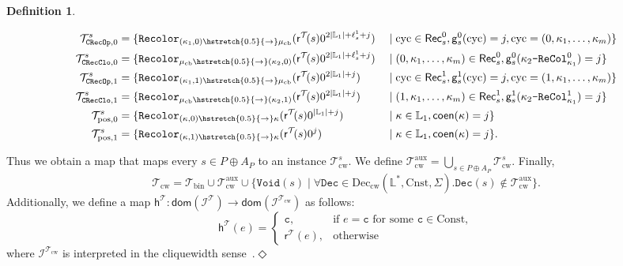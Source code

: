 \documentclass[10pt,a4paper]{amsart}
\theoremstyle{definition}
\numberwithin{equation}{section}
\theoremstyle{plain}
\theoremstyle{definition}
\newtheorem{definition}[definition]{Definition}
\theoremstyle{myexample}
\theoremstyle{plain}
\theoremstyle{definition}
\newcommand{\instance}{\mathcal{I}}
\newcommand{\inst}{\instance}
\newcommand{\adom}[1]{\fcn{dom}(#1)}
\newcommand{\cols}{\mathbb{L}}
\newcommand{\disun}{\oplus}
\newcommand{\recol}[2]{#2\pred{\texttt{-}ReCol}_{#1}}
\newcommand{\fcn}[1]{\mathsf{#1}}
\newcommand{\pred}[1]{\mathtt{#1}}
\newcommand{\const}[1]{\mathtt{#1}}
\newcommand{\defend}{\hfill\ensuremath{\Diamond}}
\newcommand{\shortto}{\hstretch{0.5}{\to}}
\begin{document}
\begin{definition}
\begin{itemize}
\begin{align*}
			\mathcal{T}_{\pred{CRecOp}, 0}^{s} &=  \{ \pred{Recolor}_{(\kappa_1, 0)\shortto\mu_{\mathrm{cb}}}(\fcn{r}^{\mathcal{T}}\!(s)0^{2|\cols_1| + \ell_s^1+ j}) &&\mid \mathrm{cyc}\in\fcn{Rec}_s^{0}, \fcn{g}_s^{0}(\mathrm{cyc}) = j, \mathrm{cyc} = (0, \kappa_1, \ldots, \kappa_m)  \} \\
			\mathcal{T}_{\pred{CRecClo}, 0}^{s} &=  \{ \pred{Recolor}_{\mu_{\mathrm{cb}} \shortto (\kappa_2, 0)}(\fcn{r}^{\mathcal{T}}\!(s)0^{2|\cols_1| + \ell_s^1+ j}) &&\mid (0, \kappa_1, \ldots, \kappa_m)\in\fcn{Rec}_s^{0} , \fcn{g}_s^{0}(\recol{\kappa_1}{\kappa_2}^0) = j \} \\
			\mathcal{T}_{\pred{CRecOp}, 1}^{s} &=  \{ \pred{Recolor}_{(\kappa_1, 1)\shortto\mu_{\mathrm{cb}}}(\fcn{r}^{\mathcal{T}}\!(s)0^{2|\cols_1|  + j}) &&\mid  \mathrm{cyc}\in\fcn{Rec}_s^{1}, \fcn{g}_s^{1}( \mathrm{cyc}) = j, \mathrm{cyc} = (1, \kappa_1, \ldots, \kappa_m) \} \\
			\mathcal{T}_{\pred{CRecClo}, 1}^{s} &=  \{ \pred{Recolor}_{\mu_{\mathrm{cb}} \shortto (\kappa_2, 1)}(\fcn{r}^{\mathcal{T}}\!(s)0^{2|\cols_1| + j}) &&\mid (1, \kappa_1, \ldots, \kappa_m)\in\fcn{Rec}_s^{1} , \fcn{g}_s^{1}(\recol{\kappa_1}{\kappa_2}^1) = j \} \\
			\mathcal{T}_{\mathrm{pos}, 0}^{s} &=  \{ \pred{Recolor}_{(\kappa, 0)\shortto \kappa}(\fcn{r}^{\mathcal{T}}\!(s)0^{|\cols_1|+j}) &&\mid \kappa\in\cols_1, \fcn{coen}(\kappa) = j \} \\
			\mathcal{T}_{\mathrm{pos}, 1}^{s} &=  \{ \pred{Recolor}_{(\kappa, 1)\shortto \kappa}(\fcn{r}^{\mathcal{T}}\!(s)0^{j}) &&\mid \kappa\in\cols_1, \fcn{coen}(\kappa) = j \}.
		\end{align*}
	\end{itemize}
	Thus we obtain a map that maps every $s\in P\oplus A_P$ to an instance $\mathcal{T}_{\mathrm{cw}}^s$.
	We define $\mathcal{T}_{\mathrm{cw}}^{\mathrm{aux}} = \bigcup_{s\in P\disun A_P}\mathcal{T}_{\mathrm{cw}}^{s}$. Finally,
	$$\mathcal{T}_{\mathrm{cw}} = \mathcal{T}_{\mathrm{bin}} \cup \mathcal{T}_{\mathrm{cw}}^{\mathrm{aux}} \cup \{ \pred{Void}(s) \mid \forall \pred{Dec} \in\mathrm{Dec}_{\mathrm{cw}}(\cols^*, \mathrm{Cnst}, \Sigma).  \pred{Dec}(s)\notin \mathcal{T}_{\mathrm{cw}}^{\mathrm{aux}} \}.$$%
	Additionally, we define a map $\fcn{h}^{\mathcal{T}}\colon \adom{\inst^{\mathcal{T}}} \to \adom{\inst^{\mathcal{T}_{\mathrm{cw}}}}$ as follows:
	$$\fcn{h}^{\mathcal{T}}\!(e) = \begin{cases} \const{c}, &\text{if } e = \const{c} \text{ for some } \const{c}\in\mathrm{Const}, \\ \fcn{r}^{\mathcal{T}}\!(e), &\text{otherwise} \end{cases}$$%
	where $\inst^{\mathcal{T}_{\mathrm{cw}}}$ is interpreted in the cliquewidth sense~\cite[Definition 7]{ICDT2023}.\defend
\end{definition}
\end{document}
